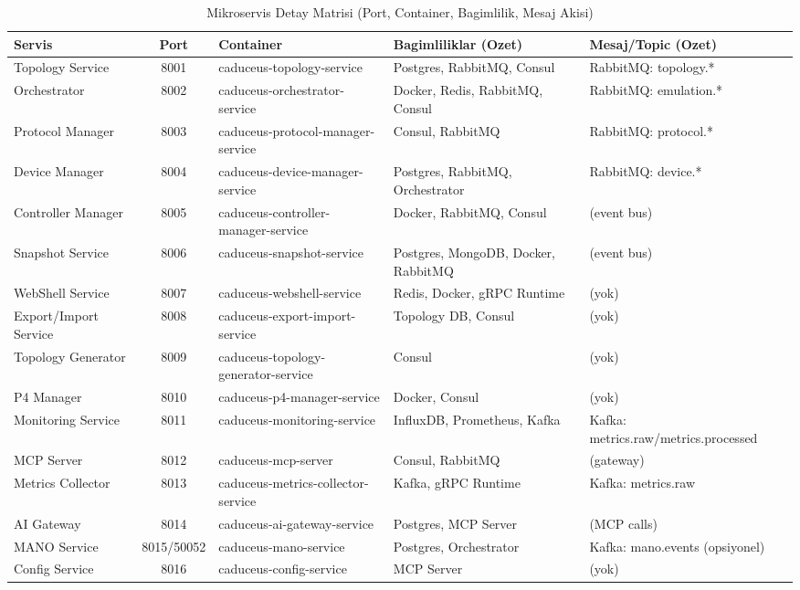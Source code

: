 \documentclass[conference]{IEEEtran}
\begin{document}
\begin{table}[t]
\caption{Mikroservis Detay Matrisi (Port, Container, Bagimlilik, Mesaj Akisi)}
\label{tab:svc_matrix}
\centering
\scriptsize
\setlength{\tabcolsep}{3pt}
\begin{tabularx}{\textwidth}{l c l Y Y}
\toprule
Servis & Port & Container & Bagimliliklar (Ozet) & Mesaj/Topic (Ozet) \\
\midrule
Topology Service & 8001 & caduceus-topology-service & Postgres, RabbitMQ, Consul & RabbitMQ: topology.* \\
Orchestrator & 8002 & caduceus-orchestrator-service & Docker, Redis, RabbitMQ, Consul & RabbitMQ: emulation.* \\
Protocol Manager & 8003 & caduceus-protocol-manager-service & Consul, RabbitMQ & RabbitMQ: protocol.* \\
Device Manager & 8004 & caduceus-device-manager-service & Postgres, RabbitMQ, Orchestrator & RabbitMQ: device.* \\
Controller Manager & 8005 & caduceus-controller-manager-service & Docker, RabbitMQ, Consul & (event bus) \\
Snapshot Service & 8006 & caduceus-snapshot-service & Postgres, MongoDB, Docker, RabbitMQ & (event bus) \\
WebShell Service & 8007 & caduceus-webshell-service & Redis, Docker, gRPC Runtime & (yok) \\
Export/Import Service & 8008 & caduceus-export-import-service & Topology DB, Consul & (yok) \\
Topology Generator & 8009 & caduceus-topology-generator-service & Consul & (yok) \\
P4 Manager & 8010 & caduceus-p4-manager-service & Docker, Consul & (yok) \\
Monitoring Service & 8011 & caduceus-monitoring-service & InfluxDB, Prometheus, Kafka & Kafka: metrics.raw/metrics.processed \\
MCP Server & 8012 & caduceus-mcp-server & Consul, RabbitMQ & (gateway) \\
Metrics Collector & 8013 & caduceus-metrics-collector-service & Kafka, gRPC Runtime & Kafka: metrics.raw \\
AI Gateway & 8014 & caduceus-ai-gateway-service & Postgres, MCP Server & (MCP calls) \\
MANO Service & 8015/50052 & caduceus-mano-service & Postgres, Orchestrator & Kafka: mano.events (opsiyonel) \\
Config Service & 8016 & caduceus-config-service & MCP Server & (yok) \\

\end{tabularx}
\end{table}
\end{document}
